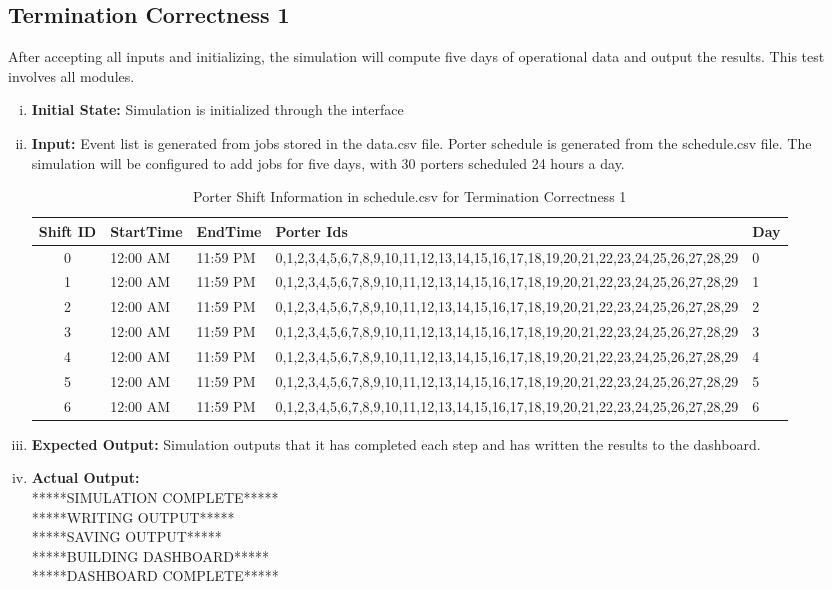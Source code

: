 \documentclass[paper=letter, fontsize=10pt]{scrartcl}
\numberwithin{equation}{section}		%
\numberwithin{figure}{section}			%
\numberwithin{table}{section}				%
\begin{document}
\begin{enumerate}[(i)]
\subsection{Termination Correctness 1}
After accepting all inputs and initializing, the simulation will compute five days of operational data and output the results. This test involves all modules.
\begin{enumerate}[(i)]
	\item \textbf{Initial State:} Simulation is initialized through the interface
	\item \textbf{Input:} Event list is generated from jobs stored in the data.csv file. Porter schedule is generated from the schedule.csv file. The simulation will be configured to add jobs for five days, with 30 porters scheduled 24 hours a day.
	\begin{table}
	\caption{Porter Shift Information in schedule.csv for Termination Correctness 1}
	\begin{center}
    	\begin{tabular}{| c | l | l | l | l |}
    		\hline
        	Shift ID & StartTime & EndTime & Porter Ids & Day \\ \hline
  			0 & 12:00 AM & 11:59 PM & 0,1,2,3,4,5,6,7,8,9,10,11,12,13,14,15,16,17,18,19,20,21,22,23,24,25,26,27,28,29 & 0 \\ \hline
  			1 & 12:00 AM & 11:59 PM & 0,1,2,3,4,5,6,7,8,9,10,11,12,13,14,15,16,17,18,19,20,21,22,23,24,25,26,27,28,29 & 1 \\ \hline
  			2 & 12:00 AM & 11:59 PM & 0,1,2,3,4,5,6,7,8,9,10,11,12,13,14,15,16,17,18,19,20,21,22,23,24,25,26,27,28,29 & 2 \\ \hline
  			3 & 12:00 AM & 11:59 PM & 0,1,2,3,4,5,6,7,8,9,10,11,12,13,14,15,16,17,18,19,20,21,22,23,24,25,26,27,28,29 & 3 \\ \hline
  			4 & 12:00 AM & 11:59 PM & 0,1,2,3,4,5,6,7,8,9,10,11,12,13,14,15,16,17,18,19,20,21,22,23,24,25,26,27,28,29 & 4 \\ \hline
  			5 & 12:00 AM & 11:59 PM & 0,1,2,3,4,5,6,7,8,9,10,11,12,13,14,15,16,17,18,19,20,21,22,23,24,25,26,27,28,29 & 5 \\ \hline
  			6 & 12:00 AM & 11:59 PM & 0,1,2,3,4,5,6,7,8,9,10,11,12,13,14,15,16,17,18,19,20,21,22,23,24,25,26,27,28,29 & 6 \\ \hline
    	\end{tabular}
	\end{center}
	\end{table}
	\item \textbf{Expected Output:} Simulation outputs that it has completed each step and has written the results to the dashboard.
	\item \textbf{Actual Output:}\\
	*****SIMULATION COMPLETE*****\\
	*****WRITING OUTPUT*****\\
	*****SAVING OUTPUT*****\\
	*****BUILDING DASHBOARD*****\\
	*****DASHBOARD COMPLETE*****\\
\end{enumerate}


\end{enumerate}
\end{document}
